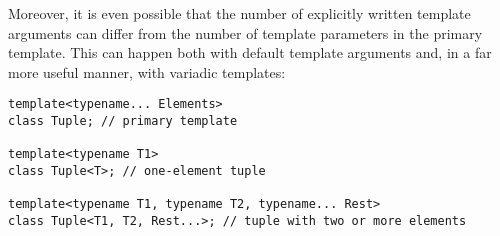 Moreover, it is even possible that the number of explicitly written template arguments can differ from the number of template parameters in the primary template. This can happen both with default template arguments and, in a far more useful manner, with variadic templates:

\begin{lstlisting}[style=styleCXX]
template<typename... Elements>
class Tuple; // primary template

template<typename T1>
class Tuple<T>; // one-element tuple

template<typename T1, typename T2, typename... Rest>
class Tuple<T1, T2, Rest...>; // tuple with two or more elements
\end{lstlisting}



















